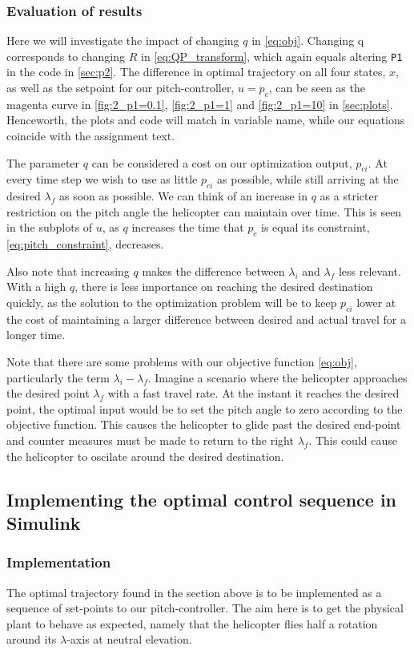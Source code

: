 \subsubsection{Evaluation of results}
Here we will investigate the impact of changing $q$ in \cref{eq:obj}. Changing q corresponds to changing $R$ in \cref{eq:QP_transform}, which again equals altering \texttt{P1} in the code in \cref{sec:p2}. The difference in optimal trajectory on all four states, $x$, as well as the setpoint for our pitch-controller, $u=p_c$, can be seen as the magenta curve in \cref{fig:2_p1=0.1}, \cref{fig:2_p1=1} and \cref{fig:2_p1=10} in \cref{sec:plots}. Henceworth, the plots and code will match in variable name, while our equations coincide with the assignment text. 

The parameter $q$ can be considered a cost on our optimization output, $p_{ci}$. At every time step we wish to use as little $p_{ci}$ as possible, while still arriving at the desired $\lambda_f$ as soon as possible. We can think of an increase in $q$ as a stricter restriction on the pitch angle the helicopter can maintain over time. This is seen in the subplots of $u$, as $q$ increases the time that $p_c$ is equal its constraint, \cref{eq:pitch_constraint}, decreases.

Also note that increasing $q$ makes the difference between $\lambda_i$ and $\lambda_f$ less relevant. With a high $q$, there is less importance on reaching the desired destination quickly, as the solution to the optimization problem will be to keep $p_{ci}$ lower at the cost of maintaining a larger difference between desired and actual travel for a longer time.

Note that there are some problems with our objective function \cref{eq:obj}, particularly the term $\lambda_i - \lambda_f$. Imagine a scenario where the helicopter approaches the desired point $\lambda_f$ with a fast travel rate. At the instant it reaches the desired point, the optimal input would be to set the pitch angle to zero according to the objective function. This causes the helicopter to glide past the desired end-point and counter measures must be made to return to the right $\lambda_f$. This could cause the helicopter to oscilate around the desired destination.

\subsection{Implementing the optimal control sequence in Simulink}
\subsubsection{Implementation}
The optimal trajectory found in the section above is to be implemented as a sequence of set-points to our pitch-controller. The aim here is to get the physical plant to behave as expected, namely that the helicopter flies half a rotation around its $\lambda$-axis at neutral elevation.


